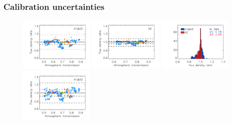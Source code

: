 \subsubsection{Calibration uncertainties}

\begin{figure}[ht!]
  \begin{center}
    \includegraphics[clip=true, trim={0.9cm, 0.2cm, 0, 0.6cm}, width=0.32\textwidth]{Figures/Calibration/plot_flux_density_ratio_obstau_allbright_corrected_skydip_narrow_1mm.pdf}
    \includegraphics[clip=true, trim={0.9cm, 0.2cm, 0, 0.6cm}, width=0.32\textwidth]{Figures/Calibration/plot_flux_density_ratio_obstau_allbright_corrected_skydip_narrow_a2.pdf}
    \includegraphics[clip=true, trim={0.9cm, 0.2cm, 0, 0.6cm}, width=0.32\textwidth]{Figures/Calibration/plot_histo_flux_density_ratio_obstau_allbright_corrected_skydip_narrow_1n2mm.pdf}
    \includegraphics[clip=true, trim={0.9cm, 0.2cm, 0, 0.6cm}, width=0.32\textwidth]{Figures/Calibration/plot_flux_density_ratio_obstau_allbright_tau225_narrow_1mm.pdf}

\end{center}
\end{figure}
